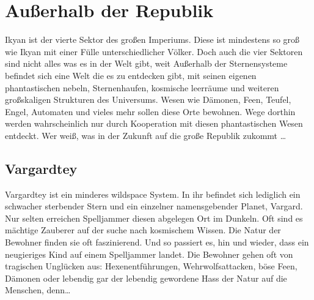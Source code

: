 \documentclass{book}
\begin{document}
\chapter{Außerhalb der Republik}
    Ikyan ist der vierte Sektor des großen Imperiums. Diese ist mindestens so groß wie Ikyan mit einer Fülle unterschiedlicher Völker. Doch auch die vier Sektoren sind nicht alles was es in der Welt gibt, weit Außerhalb der Sternensysteme befindet sich eine Welt die es zu entdecken gibt, mit seinen eigenen phantastischen nebeln, Sternenhaufen, kosmische leerräume und weiteren großskaligen Strukturen des Universums. Wesen wie Dämonen, Feen, Teufel, Engel, Automaten und vieles mehr sollen diese Orte bewohnen. Wege dorthin werden wahrscheinlich nur durch Kooperation mit diesen phantastischen Wesen entdeckt. Wer weiß, was in der Zukunft auf die große Republik zukommt \dots

    \section{Vargardtey}

    Vargardtey ist ein minderes wildspace System. In ihr befindet sich lediglich ein schwacher sterbender Stern und ein einzelner namensgebender Planet, Vargard. Nur selten erreichen Spelljammer diesen abgelegen Ort im Dunkeln. Oft sind es mächtige Zauberer auf der suche nach kosmischem Wissen. Die Natur der Bewohner finden sie oft faszinierend. Und so passiert es, hin und wieder, dass ein neugieriges Kind auf einem Spelljammer landet. Die Bewohner gehen oft von tragischen Unglücken aus: Hexenentführungen, Wehrwolfsattacken, böse Feen, Dämonen oder lebendig gar der lebendig gewordene Hass der Natur auf die Menschen, denn\dots\\
\end{document}
